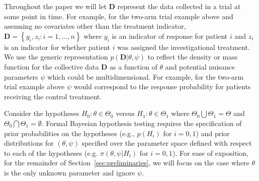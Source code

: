 \documentclass[12pt]{article}
\begin{document}
Throughout the paper we will let $\mathbf{D}$ represent the data collected in a trial at some point in time. 
%
For example, for the two-arm trial example above and assuming no covariates other than the treatment indicator, $\mathbf{D}=\left\{y_i,z_i:i=1,...,n\right\}$ where $y_i$ is an 
indicator of response for patient $i$ and $z_i$ is an indicator for whether patient $i$ was assigned the investigational treatment.
%
We use the generic representation $p(\mathbf{D}|\theta,\psi)$ to reflect the density or mass function for the collective data $\mathbf{D}$ as a function of $\theta$ and potential nuisance parameters
$\psi$ which could be multidimensional.
%
For example, for the two-arm trial example above $\psi$ would correspond to the response probability for patients receiving the control treatment.


Consider the hypotheses $H_0:\theta\in\Theta_{0}$ versus $H_1:\theta\in\Theta_{1}$ where $\Theta_{0}\bigcup \Theta_{1} = \Theta$ and $\Theta_{0} \bigcap \Theta_{1} = \emptyset$.
%
Formal Bayesian hypothesis testing requires the specification of prior probabilities on the hypotheses (e.g., $p(H_i)$ for $i=0,1$)
and prior distributions for $\left(\theta,\psi\right)$ specified over the parameter space defined with respect to each of the 
hypotheses (e.g. $\pi\left(\theta,\psi \big| H_i\right)$ for $i=0,1$). 
%
For ease of exposition, for the remainder of Section~\ref{sec:preliminaries}, we will focus on the case where $\theta$ is the 
only unknown parameter and ignore $\psi$.
\end{document}
